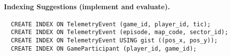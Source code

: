 \documentclass[11pt]{article}
\begin{document}
%
%
%
%

\paragraph{Indexing Suggestions (implement and evaluate).}
\begin{verbatim}
  CREATE INDEX ON TelemetryEvent (game_id, player_id, tic);
  CREATE INDEX ON TelemetryEvent (episode, map_code, sector_id);
  CREATE INDEX ON TelemetryEvent USING gist ((pos_x, pos_y));
  CREATE INDEX ON GameParticipant (player_id, game_id);
\end{verbatim}
\end{document}
